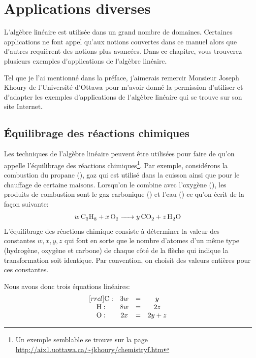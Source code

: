 \chapter{Applications diverses}

L'algèbre linéaire est utilisée dans un grand nombre de domaines.
Certaines applications ne font appel qu'aux notions couvertes dans ce manuel alors
que d'autres requièrent des notions plus avancées.  Dans ce chapitre, vous
trouverez plusieurs exemples d'applications de l'algèbre linéaire.

Tel que je l'ai mentionné dans la préface, j'aimerais remercir
Monsieur Joseph Khoury de l'Université d'Ottawa pour m'avoir
donné la permission d'utiliser et d'adapter les exemples d'applications de l'algèbre linéaire qui 
se trouve sur son site Internet.


\section{Équilibrage des réactions chimiques}

Les techniques de l'algèbre linéaire peuvent être utilisées pour
faire de qu'on appelle l'équilibrage des réactions chimiques\footnote{Un
exemple semblable se trouve sur la page \url{http://aix1.uottawa.ca/~jkhoury/chemistryf.htm}}.
Par exemple, considérons la combustion du propane (), gaz qui est
utilisé dans la cuisson ainsi que pour le chauffage de certaine maisons.  
Lorsqu'on le combine avec l'oxygène (), les produits de combustion sont
le gaz carbonique () et l'eau () ce qu'on écrit de la façon 
suivante:
\[
\ce{$w\,$C3H8 + $x\,$O2 -> $y\,$CO2 + $z\,$H2O }
\]
L'équilibrage des réactions chimique consiste à déterminer la valeur
des constantes $w, x, y, z$ qui font en sorte que le nombre d'atomes
d'un même type (hydrogène, oxygène et carbone) de chaque côté de
la flèche \ce{->} qui indique la transformation soit identique.
Par convention, on choisit des valeurs entières pour ces constantes.

Nous avons donc trois équations linéaires:
\[
\begin{matrix}[rrcl]
\cf{C}: & 3w &=& y \\
\cf{H}: & 8w &=& 2z \\
\cf{O}: & 2x &=& 2y + z
\end{matrix}
\]

